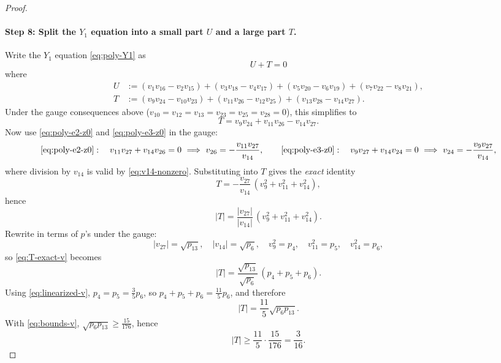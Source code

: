 \documentclass[11pt]{article}
\begin{document}
\begin{proof}
\paragraph{Step 8: Split the $Y_1$ equation into a small part $U$ and a large part $T$.}
Write the $Y_1$ equation \eqref{eq:poly-Y1} as
\[
U+T=0
\]
where
\[
\begin{aligned}
U&:=(v_1v_{16}-v_2v_{15})+(v_3v_{18}-v_4v_{17})+(v_5v_{20}-v_6v_{19})+(v_7v_{22}-v_8v_{21}),\\
T&:=(v_9v_{24}-v_{10}v_{23})+(v_{11}v_{26}-v_{12}v_{25})+(v_{13}v_{28}-v_{14}v_{27}).
\end{aligned}
\]
Under the gauge consequences above ($v_{10}=v_{12}=v_{13}=v_{23}=v_{25}=v_{28}=0$), this simplifies to
\[
T=v_9v_{24}+v_{11}v_{26}-v_{14}v_{27}.
\]
Now use \eqref{eq:poly-e2-z0} and \eqref{eq:poly-e3-z0} in the gauge:
\[
\eqref{eq:poly-e2-z0}:\quad v_{11}v_{27}+v_{14}v_{26}=0
\ \Longrightarrow\ 
v_{26}=-\frac{v_{11}v_{27}}{v_{14}},
\qquad
\eqref{eq:poly-e3-z0}:\quad v_{9}v_{27}+v_{14}v_{24}=0
\ \Longrightarrow\ 
v_{24}=-\frac{v_{9}v_{27}}{v_{14}},
\]
where division by $v_{14}$ is valid by \eqref{eq:v14-nonzero}.
Substituting into $T$ gives the \emph{exact} identity
\[
T=-\frac{v_{27}}{v_{14}}\,(v_9^2+v_{11}^2+v_{14}^2),
\]
hence
\begin{equation}
\label{eq:T-exact-v}
|T|=\frac{|v_{27}|}{|v_{14}|}\,(v_9^2+v_{11}^2+v_{14}^2).
\end{equation}
Rewrite in terms of $p$'s under the gauge:
\[
|v_{27}|=\sqrt{p_{13}},\quad |v_{14}|=\sqrt{p_6},\quad v_9^2=p_4,\quad v_{11}^2=p_5,\quad v_{14}^2=p_6,
\]
so \eqref{eq:T-exact-v} becomes
\[
|T|=\frac{\sqrt{p_{13}}}{\sqrt{p_6}}\,(p_4+p_5+p_6).
\]
Using \eqref{eq:linearized-v}, $p_4=p_5=\frac35 p_6$, so $p_4+p_5+p_6=\frac{11}{5}p_6$, and therefore
\begin{equation}
\label{eq:T-sqrt-v}
|T|=\frac{11}{5}\sqrt{p_6p_{13}}.
\end{equation}
With \eqref{eq:bounds-v}, $\sqrt{p_6p_{13}}\ge \frac{15}{176}$, hence
\begin{equation}
\label{eq:T-lower-v}
|T|\ge \frac{11}{5}\cdot \frac{15}{176}=\frac{3}{16}.
\end{equation}


\end{proof}
\end{document}
